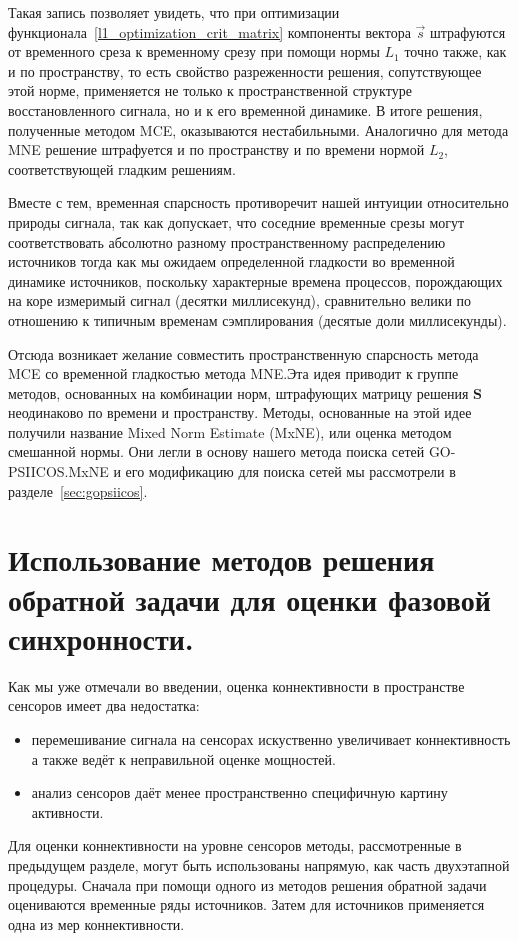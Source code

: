Такая запись позволяет увидеть, что при оптимизации
функционала~\ref{l1_optimization_crit_matrix} компоненты вектора $\vec{s}$
штрафуются от временного среза к временному срезу при помощи нормы $L_1$ точно
также, как и по пространству, то есть свойство разреженности решения,
сопутствующее этой норме, применяется не только к пространственной структуре
восстановленного сигнала, но и к его временной динамике. В итоге решения,
полученные методом MCE, оказываются нестабильными. Аналогично для метода
MNE решение штрафуется и по пространству и по времени нормой $L_2$, соответствующей
гладким решениям.

Вместе с тем, временная спарсность противоречит нашей интуиции относительно
природы сигнала, так как допускает, что соседние временные срезы могут
соответствовать абсолютно разному пространственному распределению источников
тогда как мы ожидаем определенной гладкости во временной динамике источников,
поскольку характерные времена процессов, порождающих на коре
измеримый сигнал (десятки миллисекунд), сравнительно велики по отношению к типичным временам
сэмплирования (десятые доли миллисекунды).

Отсюда возникает желание совместить пространственную спарсность метода MCE со
временной гладкостью метода MNE.\@ Эта идея приводит к группе методов,
основанных на комбинации норм, штрафующих матрицу решения $\mathbf{S}$
неодинаково по времени и пространству. Методы, основанные на этой идее получили
название Mixed Norm Estimate (MxNE), или оценка методом смешанной нормы.
Они легли в основу нашего метода поиска сетей GO-PSIICOS. MxNE и его
модификацию для поиска сетей мы рассмотрели в разделе~\ref{sec:gopsiicos}.

\section{Использование методов решения обратной задачи для оценки фазовой синхронности.}
Как мы уже отмечали во введении, оценка коннективности в пространстве сенсоров
имеет два недостатка:
\begin{itemize}
    \item перемешивание сигнала на сенсорах искуственно увеличивает коннективность
        а также ведёт к неправильной оценке мощностей.
    \item анализ сенсоров даёт менее пространственно специфичную картину активности.
\end{itemize}

Для оценки коннективности на уровне сенсоров методы, рассмотренные в предыдущем разделе, могут быть использованы
напрямую, как часть двухэтапной процедуры. Сначала при помощи одного из методов решения обратной задачи
оцениваются временные ряды источников. Затем для источников применяется одна из мер коннективности.

